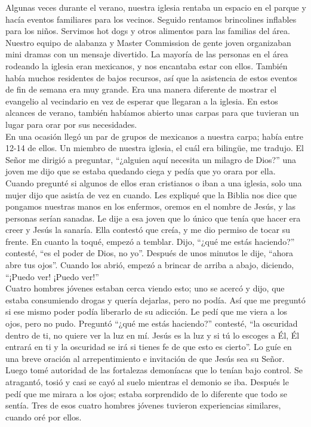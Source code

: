 \documentclass[twoside, 12pt]{book}
\begin{document}
Algunas veces durante el verano, nuestra iglesia rentaba un espacio en el parque y hacía eventos familiares para los vecinos. Seguido rentamos brincolines inflables para los niños. Servimos hot dogs y otros alimentos para las familias del área. Nuestro equipo de alabanza y Master Commission de gente joven organizaban mini dramas con un mensaje divertido. La mayoría de las personas en el área rodeando la iglesia eran mexicanos, y nos encantaba estar con ellos. También había muchos residentes de bajos recursos, así que la asistencia de estos eventos de fin de semana era muy grande. Era una manera diferente de mostrar el evangelio al vecindario en vez de esperar que llegaran a la iglesia. En estos alcances de verano, también habíamos abierto unas carpas para que tuvieran un lugar para orar por sus necesidades.\\

En una ocasión llegó un par de grupos de mexicanos a nuestra carpa; había entre 12-14 de ellos.  Un miembro de nuestra iglesia, el cuál era bilingüe, me tradujo. El Señor me dirigió a preguntar, “¿alguien aquí necesita un milagro de Dios?” una joven me dijo que se estaba quedando ciega y pedía que yo orara por ella. Cuando pregunté si algunos de ellos eran cristianos o iban a una iglesia, solo una mujer dijo que asistía de vez en cuando. Les expliqué que la Biblia nos dice que pongamos nuestras manos en los enfermos, oremos en el nombre de Jesús, y las personas serían sanadas. Le dije a esa joven que lo único que tenía que hacer era creer y Jesús la sanaría. Ella contestó que creía, y me dio permiso de tocar su frente. En cuanto la toqué, empezó a temblar. Dijo, “¿qué me estás haciendo?” contesté, “es el poder de Dios, no yo”.  Después de unos minutos le dije, “ahora abre tus ojos”. Cuando los abrió, empezó a brincar de arriba a abajo, diciendo, “¡Puedo ver! ¡Puedo ver!”\\

 Cuatro hombres jóvenes estaban cerca viendo esto; uno se acercó y dijo, que estaba consumiendo drogas y quería dejarlas, pero no podía. Así que me preguntó si ese mismo poder podía liberarlo de su adicción. Le pedí que me viera a los ojos, pero no pudo. Preguntó “¿qué me estás haciendo?” contesté, “la oscuridad dentro de ti, no quiere ver la luz en mí. Jesús es la luz y si tú lo escoges a Él, Él entrará en ti y la oscuridad se irá si tienes fe de que esto es cierto”. Lo guíe en una breve oración al arrepentimiento e invitación de que Jesús sea su Señor. Luego tomé autoridad de las fortalezas demoníacas que lo tenían bajo control. Se atragantó, tosió y casi se cayó al suelo mientras el demonio se iba. Después le pedí que me mirara a los ojos; estaba sorprendido de lo diferente que todo se sentía. Tres de esos cuatro hombres jóvenes tuvieron experiencias similares, cuando oré por ellos.\\
 
\end{document}
